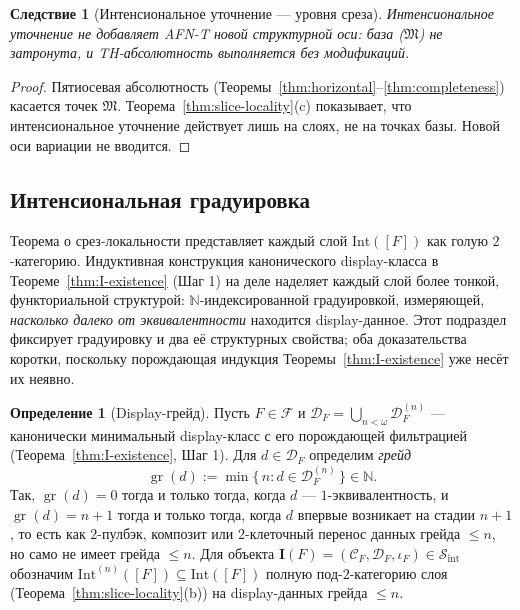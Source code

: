 \documentclass[11pt]{article}
\theoremstyle{plain}
\newtheorem{corollary}[theorem]{Следствие}
\theoremstyle{definition}
\newtheorem{definition}[theorem]{Определение}
\newcommand{\cS}{\mathcal{S}}
\newcommand{\cF}{\mathcal{F}}
\newcommand{\cC}{\mathcal{C}}
\newcommand{\cD}{\mathcal{D}}
\newcommand{\fM}{\mathfrak{M}}
\newcommand{\Sint}{\cS_{\mathrm{int}}}
\newcommand{\II}{\mathbf{I}}
\newcommand{\gr}{\operatorname{gr}}
\begin{document}
\begin{corollary}[Интенсиональное уточнение — уровня среза]\label{cor:slice-level}
Интенсиональное уточнение не добавляет AFN-T новой структурной оси: база ($\fM$) не затронута, и TH-абсолютность выполняется без модификаций.
\end{corollary}

\begin{proof}
Пятиосевая абсолютность (Теоремы~\ref{thm:horizontal}--\ref{thm:completeness}) касается точек $\fM$. Теорема~\ref{thm:slice-locality}(c) показывает, что интенсиональное уточнение действует лишь на слоях, не на точках базы. Новой оси вариации не вводится.
\end{proof}

\subsection{Интенсиональная градуировка}\label{sec:intensional-grading}

Теорема о срез-локальности представляет каждый слой $\mathrm{Int}([F])$ как голую $2$-категорию. Индуктивная конструкция канонического display-класса в Теореме~\ref{thm:I-existence} (Шаг 1) на деле наделяет каждый слой более тонкой, функториальной структурой: $\mathbb{N}$-индексированной градуировкой, измеряющей, \emph{насколько далеко от эквивалентности} находится display-данное. Этот подраздел фиксирует градуировку и два её структурных свойства; оба доказательства коротки, поскольку порождающая индукция Теоремы~\ref{thm:I-existence} уже несёт их неявно.

\begin{definition}[Display-грейд]\label{def:display-grade}
Пусть $F \in \cF$ и $\cD_F = \bigcup_{n < \omega} \cD_F^{(n)}$ — канонически минимальный display-класс с его порождающей фильтрацией (Теорема~\ref{thm:I-existence}, Шаг 1). Для $d \in \cD_F$ определим \emph{грейд}
\[ \gr(d) := \min\{\, n : d \in \cD_F^{(n)} \,\} \in \mathbb{N}. \]
Так, $\gr(d) = 0$ тогда и только тогда, когда $d$ — $1$-эквивалентность, и $\gr(d) = n+1$ тогда и только тогда, когда $d$ впервые возникает на стадии $n+1$, то есть как $2$-пулбэк, композит или $2$-клеточный перенос данных грейда $\leq n$, но само не имеет грейда $\leq n$. Для объекта $\II(F) = (\cC_F, \cD_F, \iota_F) \in \Sint$ обозначим $\mathrm{Int}^{(n)}([F]) \subseteq \mathrm{Int}([F])$ полную под-$2$-категорию слоя (Теорема~\ref{thm:slice-locality}(b)) на display-данных грейда $\leq n$.
\end{definition}
\end{document}
